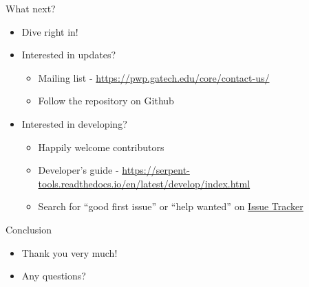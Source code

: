 \documentclass{beamer}
\begin{document}
\begin{frame}{What next?}
    \begin{itemize}
        \item{Dive right in!}
        \item{Interested in updates?}
        \begin{itemize}
            \item{Mailing list - \url{https://pwp.gatech.edu/core/contact-us/}}
            \item{Follow the repository on Github}
        \end{itemize}
        \item{Interested in developing?}
        \begin{itemize}
            \item{Happily welcome contributors}
            \item{Developer's guide - \url{https://serpent-tools.readthedocs.io/en/latest/develop/index.html}}
            \item{Search for ``good first issue'' or ``help wanted'' on \href{https://github.com/CORE-GATECH-GROUP/serpent-tools/issues}{Issue Tracker}}
        \end{itemize}
    \end{itemize}
\end{frame}

\begin{frame}{Conclusion}
    \begin{itemize}
        \item{Thank you very much!}
        \item{Any questions?}
    \end{itemize}
\end{frame}
\end{document}
